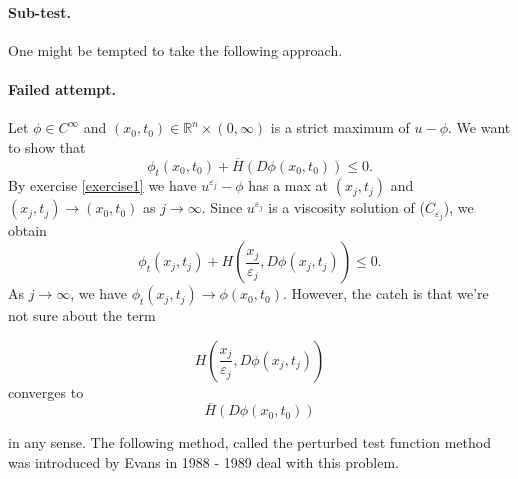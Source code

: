 \documentclass[12pt, oneside]{amsart}  	%
\begin{document}
\paragraph{\textbf{Sub-test.}} One might be tempted to take the following approach.

\paragraph{\textbf{Failed attempt.}}
Let $\phi\in C^\infty$ and $(x_0, t_0)\in \mathbb{R}^n\times (0,\infty)$ is a strict maximum of $u-\phi$. We want to show that
\begin{equation*}
\phi_t(x_0,t_0) + \overline{H}(D\phi(x_0,t_0)) \leq 0.
\end{equation*}
By exercise \ref{exercise1} we have $u^{\varepsilon_j} - \phi$ has a max at $(x_j,t_j)$ and $(x_j,t_j)\longrightarrow (x_0,t_0)$ as $j\longrightarrow \infty$. Since $u^{\varepsilon_j}$ is a viscosity solution of ($C_{\varepsilon_j}$), we obtain
\begin{equation*}
\phi_t(x_j,t_j) + H\left(\frac{x_j}{\varepsilon_j}, D\phi(x_j,t_j)\right) \leq 0.
\end{equation*}
As $j\longrightarrow \infty$, we have $\phi_t(x_j,t_j)\longrightarrow \phi(x_0,t_0)$. However, the catch is that we're not sure about the term

$$H\left(\frac{x_j}{\varepsilon_j}, D\phi(x_j,t_j)\right)$$ converges to $$\overline{H}(D\phi(x_0,t_0))$$

in any sense. The following method, called the perturbed test function method was introduced by Evans in 1988 - 1989 deal with this problem.
\end{document}
